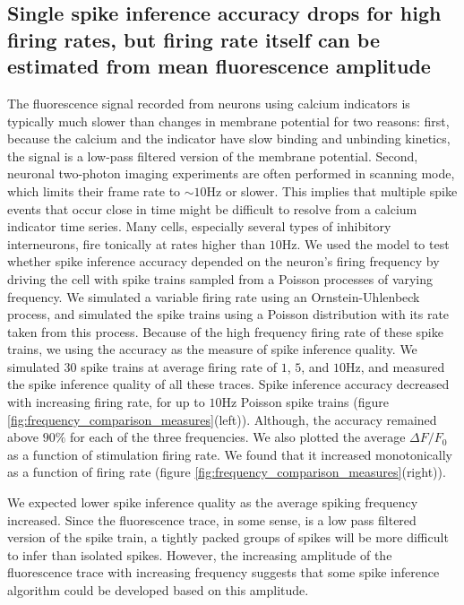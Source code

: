 \subsection{Single spike inference accuracy drops for high firing rates, but firing rate itself can be estimated from mean fluorescence amplitude}
The fluorescence signal recorded from neurons using calcium indicators is typically much slower than changes in membrane potential for two reasons: first, because the calcium and the indicator have slow binding and unbinding kinetics, the signal is a low-pass filtered version of the membrane potential. Second, neuronal two-photon imaging experiments are often performed in scanning mode, which limits their frame rate to $\sim 10$Hz or slower. This implies that multiple spike events that occur close in time might be difficult to resolve from a calcium indicator time series. Many cells, especially several types of inhibitory interneurons, fire tonically at rates higher than $10$Hz. We used the model to test whether spike inference accuracy depended on the neuron’s firing frequency by driving the cell with spike trains sampled from a Poisson processes of varying frequency. We simulated a variable firing rate using an Ornstein-Uhlenbeck process, and simulated the spike trains using a Poisson distribution with its rate taken from this process. Because of the high frequency firing rate of these spike trains, we using the accuracy as the measure of spike inference quality. We simulated $30$ spike trains at average firing rate of $1$, $5$, and $10$Hz, and measured the spike inference quality of all these traces. Spike inference accuracy decreased with increasing firing rate, for up to $10$Hz Poisson spike trains (figure \ref{fig:frequency_comparison_measures}(left)). Although, the accuracy remained above $90\%$ for each of the three frequencies. We also plotted the average $\Delta F/F_0$ as a function of stimulation firing rate. We found that it increased monotonically as a function of firing rate (figure \ref{fig:frequency_comparison_measures}(right)).

We expected lower spike inference quality as the average spiking frequency increased. Since the fluorescence trace, in some sense, is a low pass filtered version of the spike train, a tightly packed groups of spikes will be more difficult to infer than isolated spikes. However, the increasing amplitude of the fluorescence trace with increasing frequency suggests that some spike inference algorithm could be developed based on this amplitude.

